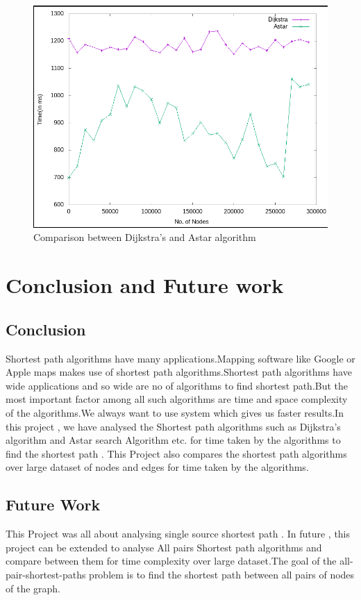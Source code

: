 \documentclass[14pt,a4]{extreport}
\begin{document}
\begin{figure}
\includegraphics[width=18cm]{images/compare.png}
\caption{Comparison between Dijkstra's and Astar algorithm}
\label{fig:1}
\end{figure}
\chapter{Conclusion and Future work }

\section{Conclusion}
Shortest path algorithms have many applications.Mapping software like Google or Apple maps makes use of shortest path algorithms.Shortest path algorithms have wide applications and so wide are no of algorithms to find shortest path.But the most important factor among all such algorithms are time and space complexity of the algorithms.We always want to use system which gives us faster results.In this project , we have analysed the Shortest path algorithms such as Dijkstra's algorithm and Astar search Algorithm etc. for time taken by the algorithms to find the shortest path . This Project also compares the shortest path algorithms over large dataset of nodes and edges for time taken by the algorithms. 
\section{Future Work}
This Project was all about analysing single source shortest path . In future , this project can be extended to analyse All pairs Shortest path algorithms and compare between them for time complexity over large dataset.The goal of the all-pair-shortest-paths problem is to find the shortest path between all pairs of nodes of the graph. 
\end{document}
